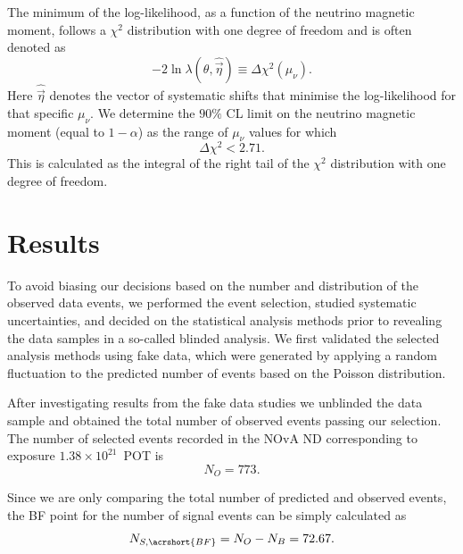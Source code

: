 The minimum of the log-likelihood, as a function of the neutrino magnetic moment, follows a $\chi^2$ distribution with one degree of freedom and is often denoted as
\begin{equation}
-2\ln\lambda\left(\theta,\hat{\overrightarrow{\eta}}\right)\equiv \Delta\chi^2\left(\mu_\nu\right).
\end{equation}
Here $\hat{\overrightarrow{\eta}}$ denotes the vector of systematic shifts that minimise the log-likelihood for that specific $\mu_\nu$. We determine the $90\%$ \gls{CL} limit on the neutrino magnetic moment (equal to $1-\alpha$) as the range of $\mu_\nu$ values for which 
\begin{equation}
\Delta\chi^2<2.71.
\end{equation}
This is calculated as the integral of the right tail of the $\chi^2$ distribution with one degree of freedom.

\section{Results}\label{sec:NuMMResults}
To avoid biasing our decisions based on the number and distribution of the observed data events, we performed the event selection, studied systematic uncertainties, and decided on the statistical analysis methods prior to revealing the data samples in a so-called blinded analysis. We first validated the selected analysis methods using fake data, which were generated by applying a random fluctuation to the predicted number of events based on the Poisson distribution.

After investigating results from the fake data studies we unblinded the data sample and obtained the total number of observed events passing our selection. The number of selected events recorded in the \gls{NOvA} \gls{ND} corresponding to exposure $1.38\times 10^{21}$~\acrshort{POT} is
\begin{equation}
N_O = 773.
\end{equation}

Since we are only comparing the total number of predicted and observed events, the \gls{BF} point for the number of signal events can be simply calculated as
\begin{equation}
N_{S,\acrshort{BF}}= N_O-N_B = 72.67.
\end{equation}

